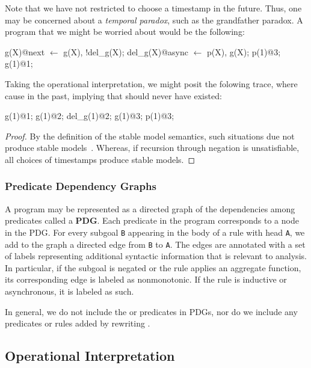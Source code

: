 Note that we have not restricted  to choose a timestamp in the future.  Thus, one may be concerned about a {\em temporal paradox}, such as the grandfather paradox.  A program that we might be worried about would be the following:

\begin{Dedalus}
g(X)@next \(\leftarrow\) g(X), !del_g(X);
del_g(X)@async \(\leftarrow\) p(X), g(X);
p(1)@3;
g(1)@1;
\end{Dedalus}

Taking the operational interpretation, we might posit the folowing trace, where  cause  in the past, implying that  should never have existed:

\begin{Dedalus}
g(1)@1;
g(1)@2;
del_g(1)@2;
g(1)@3;
p(1)@3;
\end{Dedalus}

\begin{proof}
By the definition of the stable model semantics, such situations due not produce stable models~\cite{stable-model}.  Whereas, if recursion through negation is unsatisfiable, all choices of timestamps produce stable models.
\end{proof}

\subsubsection{Predicate Dependency Graphs}

A \lang program may be represented as a directed graph of the dependencies
among predicates called a \textbf{PDG}.
Each predicate in the program corresponds to a node in the PDG.
For every subgoal \texttt{B} appearing in the body of a rule with head \texttt{A},
we add to the graph a directed edge from \texttt{B} to \texttt{A}.  The edges are annotated
with a set of labels representing additional syntactic information that is relevant to 
analysis.  In particular, if the subgoal is negated or the rule applies an aggregate function,
its corresponding edge is labeled as nonmonotonic.  If the rule is inductive or asynchronous,
it is labeled as such.

In general, we do not include the  or  predicates in PDGs,
nor do we include any predicates or rules added by rewriting .

\subsection{Operational Interpretation}

